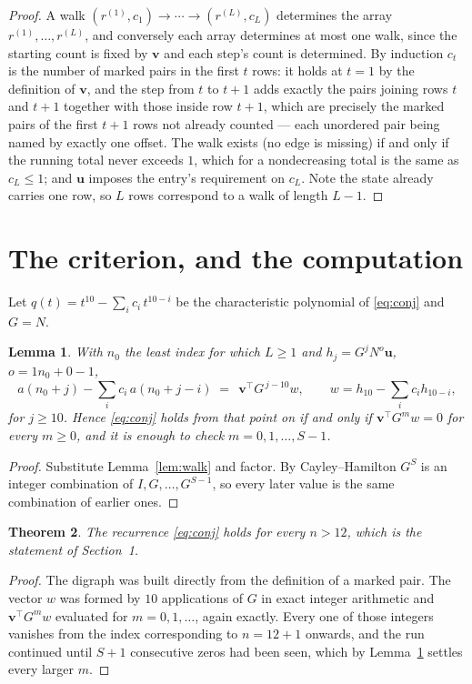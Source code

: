 \documentclass[11pt,a4paper]{article}
\theoremstyle{plain}
\newtheorem{theorem}{Theorem}
\newtheorem{lemma}[theorem]{Lemma}
\theoremstyle{definition}
\begin{document}
\begin{proof}
A walk $(r^{(1)},c_1)\to\cdots\to(r^{(L)},c_L)$ determines the array
$r^{(1)},\dots,r^{(L)}$, and conversely each array determines at most one walk, since the
starting count is fixed by $\mathbf{v}$ and each step's count is determined. By induction
$c_t$ is the number of marked pairs in the first $t$ rows: it holds at $t=1$ by the
definition of $\mathbf{v}$, and the step from $t$ to $t+1$ adds exactly the pairs joining
rows $t$ and $t+1$ together with those inside row $t+1$, which are precisely the marked
pairs of the first $t+1$ rows not already counted --- each unordered pair being named by
exactly one offset. The walk exists (no edge is missing) if and only if the running total
never exceeds $1$, which for a nondecreasing total is the same as $c_L\le1$; and
$\mathbf{u}$ imposes the entry's requirement on $c_L$. Note the state already carries one
row, so $L$ rows correspond to a walk of length $L-1$.
\end{proof}

\section{The criterion, and the computation}

Let $q(t)=t^{10}-\sum_i c_i\,t^{10-i}$ be the characteristic polynomial of
\eqref{eq:conj} and $G=N$.

\begin{lemma}\label{lem:crit}
With $n_0$ the least index for which $L\ge1$ and $h_j=G^{j}N^{o}\mathbf{u}$,
$o=1n_0+0-1$,
\[
a(n_0+j)-\sum_i c_i\,a(n_0+j-i)\;=\;\,\mathbf{v}^{\!\top}G^{\,j-10}w,
\qquad w=h_{10}-\sum_i c_i h_{10-i},
\]
for $j\ge10$. Hence \eqref{eq:conj} holds from that point on if and only if
$\mathbf{v}^{\!\top}G^{m}w=0$ for every $m\ge0$, and it is enough to check
$m=0,1,\dots,S-1$.
\end{lemma}

\begin{proof}
Substitute Lemma~\ref{lem:walk} and factor. By Cayley--Hamilton $G^{S}$ is an integer
combination of $I,G,\dots,G^{S-1}$, so every later value is the same combination of earlier
ones.
\end{proof}

\begin{theorem}
The recurrence \eqref{eq:conj} holds for every $n>12$, which is the statement of
Section~1.
\end{theorem}

\begin{proof}
The digraph was built directly from the definition of a marked pair. The vector $w$ was
formed by $10$ applications of $G$ in exact integer arithmetic and
$\mathbf{v}^{\!\top}G^{m}w$ evaluated for $m=0,1,\dots$, again exactly. Every one of
those integers vanishes from the index corresponding to $n=12+1$ onwards, and the run
continued until $S+1$ consecutive zeros had been seen, which by Lemma~\ref{lem:crit}
settles every larger $m$.
\end{proof}
\end{document}
